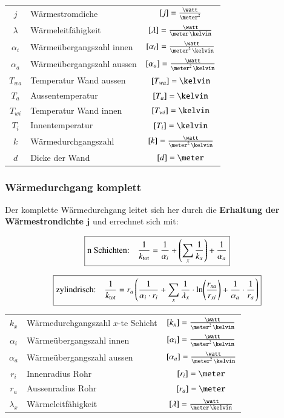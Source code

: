\renewcommand{\arraystretch}{1.3}
\begin{tabular}{c l c}
	$j$ 						& Wärmestromdiche 			& $[j] = \frac{\watt}{\meter^2}$ 								\\
	$\lambda$ 					& Wärmeleitfähigkeit 		& $[\lambda] = \frac{\watt}{\meter \, \kelvin}$ 				\\
	$\alpha_i$ 					& Wärmeübergangszahl innen 	& $[\alpha_i] = \frac{\watt}{\meter^2 \, \kelvin}$				\\
	$\alpha_a$ 					& Wärmeübergangszahl aussen & $[\alpha_a] = \frac{\watt}{\meter^2 \, \kelvin}$				\\
	$T_{wa}$ 					& Temperatur Wand aussen 	& $[T_{wa}] = \kelvin$ 											\\
	$T_a$ 						& Aussentemperatur 			& $[T_a] = \kelvin$ 											\\
	$T_{wi}$ 					& Temperatur Wand innen 	& $[T_{wi}] = \kelvin$ 											\\
	$T_i$ 						& Innentemperatur 			& $[T_i] = \kelvin$ 											\\
	$k$ 						& Wärmedurchgangszahl 		& $[k] = \frac{\watt}{\meter^2 \, \kelvin}$						\\
	$d$ 						& Dicke der Wand 			& $[d] = \meter$
\end{tabular}
\renewcommand{\arraystretch}{1}


\subsubsection{Wärmedurchgang komplett}

Der komplette Wärmedurchgang leitet sich her durch die \textbf{Erhaltung der Wärmestrondichte $\bm{j}$} und errechnet sich mit:

$$ \boxed{\text{n Schichten:} \quad \frac{1}{k_{\rm tot}} = \frac{1}{\alpha_i} + \left(\sum_x  \frac{1}{k_x}\right) + \frac{1}{\alpha_a} } $$

$$ \boxed{\text{zylindrisch:} \quad \frac{1}{k_{\rm tot}} = r_a \left( \frac{1}{\alpha_i \cdot r_i} + \sum_x \frac{1}{\lambda_x} \cdot \ln \Biggl( \frac{r_{xa}}{r_{xi}} \Biggr) + \frac{1}{\alpha_a} \cdot \frac{1}{r_a}\right) } $$


\renewcommand{\arraystretch}{1.3}
\begin{tabular}{c l c}
	$k_x$ 		& Wärmedurchgangszahl $x$-te Schicht 	& $[k_x] = \frac{\watt}{\meter^2 \, \kelvin}$ 		\\
	$\alpha_i$ 	& Wärmeübergangszahl innen 				& $[\alpha_i] = \frac{\watt}{\meter^2 \, \kelvin}$	\\
	$\alpha_a$ 	& Wärmeübergangszahl aussen 			& $[\alpha_a] = \frac{\watt}{\meter^2 \, \kelvin}$ 	\\
	$r_i$ 		& Innenradius Rohr 						& $[r_i] = \meter$									\\
	$r_a$ 		& Aussenradius Rohr 					& $[r_a] = \meter$									\\
	$\lambda_x$ & Wärmeleitfähigkeit 					& $[\lambda] = \frac{\watt}{\meter \, \kelvin}$
\end{tabular}
\renewcommand{\arraystretch}{1}


